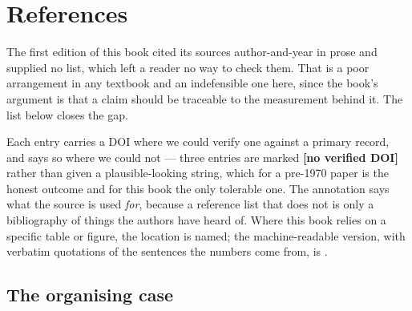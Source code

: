 \section{References}\label{app:refs}

The first edition of this book cited its sources author-and-year in prose and
supplied no list, which left a reader no way to check them. That is a poor
arrangement in any textbook and an indefensible one here, since the book's
argument is that a claim should be traceable to the measurement behind it. The
list below closes the gap.

Each entry carries a DOI where we could verify one against a primary record, and
says so where we could not --- three entries are marked \textbf{[no verified
DOI]} rather than given a plausible-looking string, which for a pre-1970 paper
is the honest outcome and for this book the only tolerable one. The annotation
says what the source is used \emph{for}, because a reference list that does not
is only a bibliography of things the authors have heard of. Where this book
relies on a specific table or figure, the location is named; the machine-readable
version, with verbatim quotations of the sentences the numbers come from, is
.

\subsection*{The organising case}

